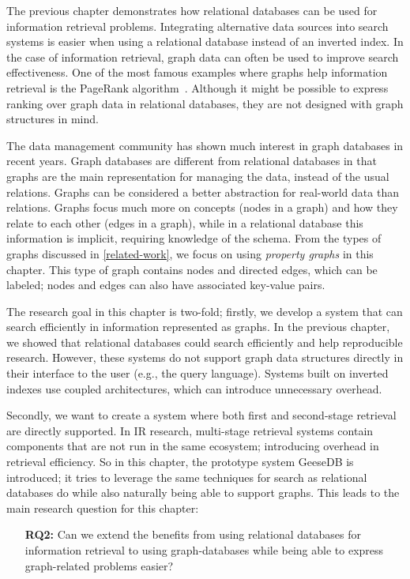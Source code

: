 The previous chapter demonstrates how relational databases can be used for information retrieval problems. Integrating alternative data sources into search systems is easier when using a relational database instead of an inverted index. In the case of information retrieval, graph data can often be used to improve search effectiveness. One of the most famous examples where graphs help information retrieval is the PageRank algorithm~\citep{pagerank}. Although it might be possible to express ranking over graph data in relational databases, they are not designed with graph structures in mind. 

The data management community has shown much interest in graph databases in recent years. Graph databases are different from relational databases in that graphs are the main representation for managing the data, instead of the usual relations. Graphs can be considered a better abstraction for real-world data than relations. Graphs focus much more on concepts (nodes in a graph) and how they relate to each other (edges in a graph), while in a relational database this information is implicit, requiring knowledge of the schema. From the types of graphs discussed in \cref{related-work}, we focus on using \emph{property graphs} in this chapter. This type of graph contains nodes and directed edges, which can be labeled; nodes and edges can also have associated key-value pairs.

The research goal in this chapter is two-fold; firstly, we develop a system that can search efficiently in information represented as graphs. In the previous chapter, we showed that relational databases could search efficiently and help reproducible research. However, these systems do not support graph data structures directly in their interface to the user (e.g., the query language). Systems built on inverted indexes use coupled architectures, which can introduce unnecessary overhead.

Secondly, we want to create a system where both first and second-stage retrieval are directly supported. In IR research, multi-stage retrieval systems contain components that are not run in the same ecosystem; introducing overhead in retrieval efficiency. 
So in this chapter, the prototype system GeeseDB is introduced; it tries to leverage the same techniques for search as relational databases do while also naturally being able to support graphs. This leads to the main research question for this chapter:

\begin{itemize}
	\item[\textbf{RQ2:}] Can we extend the benefits from using relational databases for information retrieval to using graph-databases while being able to express graph-related problems easier?
\end{itemize} 

